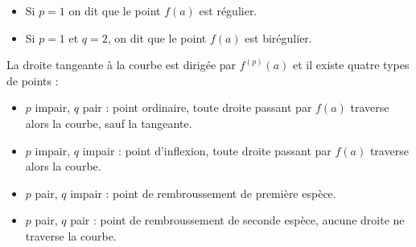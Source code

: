 \begin{itemize}
    \item Si $p = 1$ on dit que le point $f(a)$ est régulier. 
    \item Si $p = 1$ et $q = 2$, on dit que le point $f(a)$ est birégulier. 
\end{itemize}


La droite tangeante à la courbe est dirigée par $f^{(p)}(a)$ et 
il existe quatre types de points : 
\begin{itemize}
    \item $p$ impair, $q$ pair : point ordinaire, toute droite passant par $f(a)$ traverse alors la courbe, sauf la tangeante.
    \item $p$ impair, $q$ impair : point d'inflexion, toute droite passant par $f(a)$ traverse alors la courbe. 
    \item $p$ pair, $q$ impair : point de rembroussement de première espèce. 
    \item $p$ pair, $q$ pair : point de rembroussement de seconde espèce, aucune droite ne traverse la courbe.
\end{itemize}

